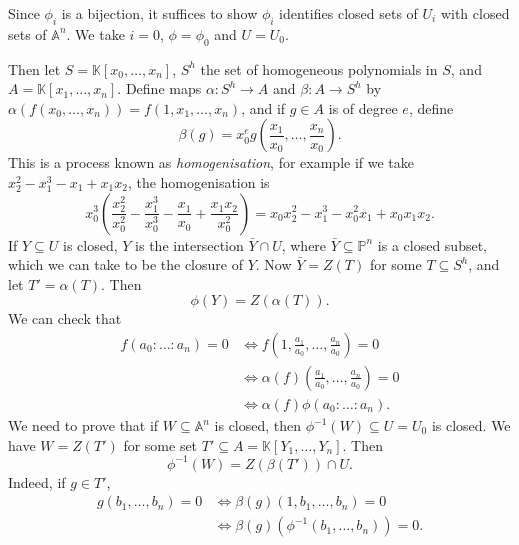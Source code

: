 \documentclass[12pt]{article}
\begin{document}
\begin{proofbox}
	Since $\phi_i$ is a bijection, it suffices to show $\phi_i$ identifies closed sets of $U_i$ with closed sets of $\mathbb{A}^n$. We take $i = 0$, $\phi = \phi_0$ and $U = U_0$.

	Then let $S = \mathbb{K}[x_0, \ldots, x_n]$, $S^h$ the set of homogeneous polynomials in $S$, and $A = \mathbb{K}[x_1, \ldots, x_n]$. Define maps $\alpha : S^h \to A$ and $\beta : A \to S^h$ by $\alpha(f(x_0, \ldots, x_n)) = f(1, x_1, \ldots, x_n)$, and if $g \in A$ is of degree $e$, define
	\[
	\beta(g) = x_0^e g \left( \frac{x_1}{x_0}, \ldots, \frac{x_n}{x_0} \right).
	\]
	This is a process known as \emph{homogenisation}, for example if we take $x_2^2 - x_1^3 - x_1 + x_1x_2$, the homogenisation is
	\[
	x_0^3 \left( \frac{x_2^2}{x_0^2} - \frac{x_1^3}{x_0^3} - \frac{x_1}{x_0} + \frac{x_1x_2}{x_0^2}\right) = x_0x_2^2 - x_1^3 - x_0^2x_1 + x_0x_1x_2.
	\]
	If $Y \subseteq U$ is closed, $Y$ is the intersection $\bar Y \cap U$, where $\bar Y \subseteq \mathbb{P}^n$ is a closed subset, which we can take to be the closure of $Y$. Now $\bar Y = Z(T)$ for some $T \subseteq S^h$, and let $T' = \alpha(T)$. Then
	\[
	\phi(Y) = Z(\alpha(T)).
	\]
	We can check that
	\begin{align*}
		f(a_0 : \ldots : a_n) = 0 &\iff f\left( 1, \frac{a_1}{a_0}, \ldots, \frac{a_n}{a_0}\right) = 0 \\
					  &\iff \alpha(f) \left( \frac{a_1}{a_0}, \ldots, \frac{a_n}{a_0} \right) = 0  \\
					  &\iff \alpha(f) \phi(a_0 : \ldots : a_n).
	\end{align*}
	We need to prove that if $W \subseteq \mathbb{A}^n$ is closed, then $\phi^{-1}(W) \subseteq U = U_0$ is closed. We have $W = Z(T')$ for some set $T' \subseteq A = \mathbb{K}[Y_1, \ldots, Y_n]$. Then
	\[
	\phi^{-1}(W) = Z(\beta(T')) \cap U.
	\]
	Indeed, if $g \in T'$,
	\begin{align*}
		g(b_1, \ldots, b_n) = 0 &\iff \beta(g)(1, b_1, \ldots, b_n) = 0 \\
					&\iff \beta(g)(\phi^{-1}(b_1, \ldots, b_n)) = 0.
	\end{align*}
\end{proofbox}
\end{document}
